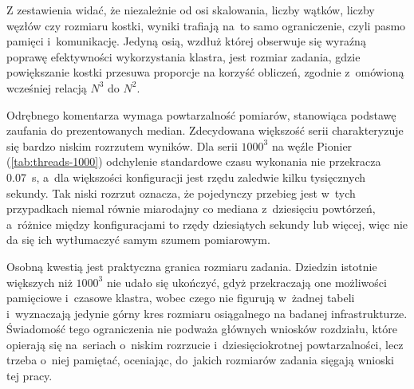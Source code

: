Z zestawienia widać, że niezależnie od osi skalowania, liczby wątków, liczby
węzłów czy rozmiaru kostki, wyniki trafiają na~to samo ograniczenie, czyli pasmo
pamięci i~komunikację. Jedyną osią, wzdłuż której obserwuje się wyraźną poprawę
efektywności wykorzystania klastra, jest rozmiar zadania, gdzie powiększanie kostki
przesuwa proporcje na korzyść obliczeń, zgodnie z~omówioną wcześniej relacją
$N^3$ do $N^2$.

Odrębnego komentarza wymaga powtarzalność pomiarów, stanowiąca podstawę
zaufania do prezentowanych median. Zdecydowana większość serii charakteryzuje
się bardzo niskim rozrzutem wyników. Dla serii $1000^3$ na węźle
Pionier (\cref{tab:threads-1000}) odchylenie standardowe czasu wykonania
nie przekracza \SI{0.07}{\second}, a~dla większości konfiguracji jest rzędu
zaledwie kilku tysięcznych sekundy. Tak niski rozrzut oznacza, że pojedynczy przebieg jest
w~tych przypadkach niemal równie miarodajny co mediana z~dziesięciu powtórzeń,
a~różnice między konfiguracjami to rzędy dziesiątych sekundy lub więcej, więc nie da się ich wytłumaczyć samym szumem pomiarowym.

Osobną kwestią jest praktyczna granica rozmiaru zadania.
Dziedzin istotnie większych niż $1000^3$ nie udało się ukończyć, gdyż przekraczają
one możliwości pamięciowe i~czasowe klastra, wobec czego nie figurują w~żadnej
tabeli i~wyznaczają jedynie górny kres rozmiaru osiągalnego na badanej
infrastrukturze. Świadomość tego ograniczenia nie podważa głównych wniosków
rozdziału, które opierają się na~seriach o~niskim rozrzucie i~dziesięciokrotnej
powtarzalności, lecz trzeba o~niej pamiętać, oceniając, do~jakich rozmiarów
zadania sięgają wnioski tej pracy.
